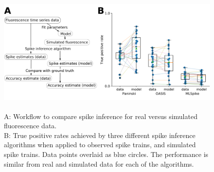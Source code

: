 \begin{figure}[h]
\centering
  \includegraphics[width=\textwidth]{figures/calcium_chapter/Figure2.png}
  \caption{\\
  A: Workflow to compare spike inference for real versus simulated fluorescence data.\\
  B: True positive rates achieved by three different spike inference algorithms when applied to observed spike trains, and simulated spike trains. Data points overlaid as blue circles. The performance is similar from real and simulated data for each of the algorithms.}
  \label{fig:three_algo_comparison}
\end{figure}

